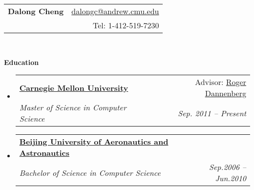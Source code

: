 \documentclass[letterpaper,11pt]{article}
\makeatletter
\newcommand{\resitem}[1]{\item #1 \vspace{-2pt}}
\newcommand{\resheading}[1]{{\large \colorbox{mygrey}{\begin{minipage}{\textwidth}{\textbf{#1 \vphantom{p\^{E}}}}\end{minipage}}}}
\newcommand{\ressubheading}[4]{
\begin{tabular*}{6.5in}{l@{\extracolsep{\fill}}r}
		\textbf{#1} & #2 \\
		\textit{#3} & \textit{#4} \\
\end{tabular*}\vspace{-6pt}}
\makeatother
\begin{document}
\newcommand{\mywebheader}{
\begin{tabular*}{7in}{l@{\extracolsep{\fill}}r}
	\textbf{\LARGE Dalong Cheng} & \href{mailto:dalongc@andrew.cmu.edu}{dalongc@andrew.cmu.edu}\\
	{\footnotesize \texttt{}} & {Tel: 1-412-519-7230} \\
	\end{tabular*}
\\
\vspace{0.1in}}

\mywebheader

\resheading{Education}
	\begin{itemize}
		\item
            \ressubheading{\href{http://www.cmu.edu}{Carnegie Mellon University}}{Advisor: \href{http://www.cs.cmu.edu/~rbd}{Roger Dannenberg}}{{Master of Science in Computer Science}}{Sep. 2011 -- Present}
        \item	
            \ressubheading{\href{http://ev.buaa.edu.cn}{Beijing University of Aeronautics and Astronautics}}{}{{Bachelor of Science in Computer Science}}{Sep.2006 -- Jun.2010}
				
\begin{comment}
		\item
			\ressubheading{\href{http://bcc.billings.k12.mt.us/}{Billings Career Center}}{Billings, MT}{\href{http://www.cisco.com/web/learning/netacad/index.html}{Cisco Networking Academy}; GPA:3.33}{Aug. 2002 - May 2003}
				{ \footnotesize
				\begin{itemize}
				\resitem{Graduated \href{http://www.cisco.com/web/learning/netacad/index.html}{Cisco Semester Four} comprising of coursework in networking infrastructures including LAN and WAN design and implementation}
				\end{itemize}
				}
\begin{comment}
		\item
			\ressubheading{\href{http://bcc.billings.k12.mt.us/}{Billings Career Center}}{Billings, MT}{\href{http://www.cisco.com/web/learning/netacad/index.html}{Cisco Networking Academy}; GPA:3.33}{Aug. 2002 - May 2003}
				{ \footnotesize
				\begin{itemize}
				\resitem{Graduated \href{http://www.cisco.com/web/learning/netacad/index.html}{Cisco Semester Four} comprising of coursework in networking infrastructures including LAN and WAN design and implementation}
				\end{itemize}
				}
\end{comment}
	\end{itemize} %
\end{document}
